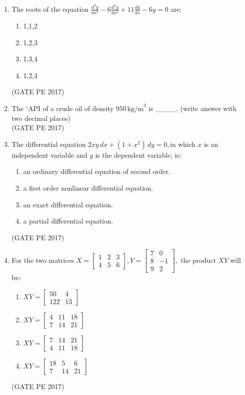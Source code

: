 \documentclass[journal,12pt,onecolumn]{IEEEtran}
\theoremstyle{remark}
\begin{document}
\begin{enumerate}[start=1, label={Q\arabic*.}]
\item The roots of the equation $ \frac{d^3 y}{dx^3} - 6 \frac{d^2 y}{dx^2} + 11 \frac{dy}{dx} - 6y = 0$ are:
\begin{enumerate}[label=(\Alph*)]
\item 1,1,2
\item 1,2,3
\item 1,3,4
\item 1,2,4
\end{enumerate}
\hfill{(GATE PE 2017)}

\item The $^\circ$API of a crude oil of density $950\, \text {kg/m}^3$ is \_\_\_\_. (write answer with two decimal places)\\

\hfill{(GATE PE 2017)}

\item The differential equation $2xy \, dx + (1 + x^2) \, dy = 0,$in which $x$ is an independent variable and $y$ is the dependent variable, is:
\begin{enumerate}
\item an ordinary differential equation of second order.
\item a first order nonlinear differential equation.
\item an exact differential equation.
\item a partial differential equation.
\end{enumerate}
\hfill{(GATE PE 2017)}

\item For the two matrices $ X = \begin{bmatrix} 1 & 2 & 3 \\ 4 & 5 & 6 \end{bmatrix}, Y = \begin{bmatrix} 7 & 0 \\ 8 & -1 \\ 9 & 2 \end{bmatrix},$ the product $XY$ will be:
\begin{enumerate}[label=(\Alph*)]
\item $XY = \begin{bmatrix} 50 & 4 \\ 122 & 13 \end{bmatrix}$
\item $XY = \begin{bmatrix} 4 & 11 & 18 \\ 7 & 14 & 21 \end{bmatrix}$
\item $XY = \begin{bmatrix} 7 & 14 & 21 \\ 4 & 11 & 18 \end{bmatrix}$
\item $XY = \begin{bmatrix} 18 & 5 & 6 \\ 7 & 14 & 21 \end{bmatrix}$
\end{enumerate}
\hfill{(GATE PE 2017)}


\end{enumerate}
\end{document}
